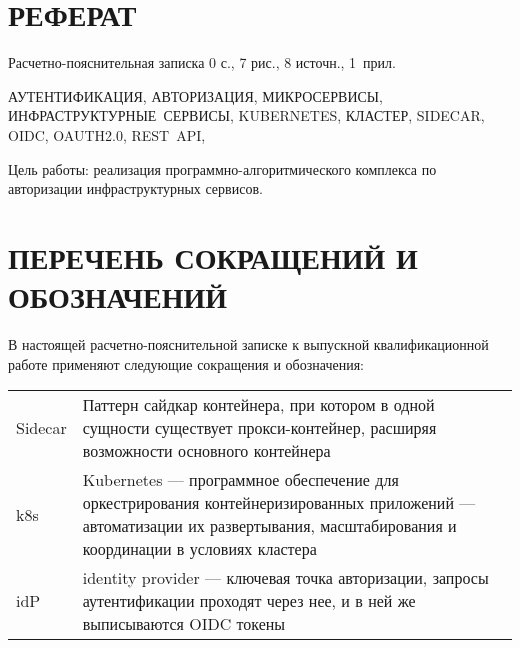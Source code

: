 {\centering \chapter*{РЕФЕРАТ}}

Расчетно-пояснительная записка 0 с., 7 рис., 8 источн., \mbox{1 прил.}

\noindent \mbox{АУТЕНТИФИКАЦИЯ}, \mbox{АВТОРИЗАЦИЯ}, \mbox{МИКРОСЕРВИСЫ}, \mbox{ИНФРАСТРУКТУРНЫЕ СЕРВИСЫ}, \mbox{KUBERNETES}, \mbox{КЛАСТЕР},  \mbox{SIDECAR}, \mbox{OIDC}, \mbox{OAUTH2.0}, \mbox{REST API},

Цель работы: реализация программно-алгоритмического комплекса по авторизации инфраструктурных сервисов.

{\centering \maketableofcontents}

{\centering \chapter*{ПЕРЕЧЕНЬ СОКРАЩЕНИЙ И ОБОЗНАЧЕНИЙ}}

В настоящей расчетно-пояснительной записке к выпускной квалификационной работе применяют следующие сокращения и обозначения:

\begin{table}[H]
\begin{tabular}{p{5cm}p{10.5cm}}
Sidecar & Паттерн сайдкар контейнера, при котором в одной сущности существует прокси-контейнер, расширяя возможности основного контейнера
\tabularnewline
k8s & Kubernetes --- программное обеспечение для оркестрирования контейнеризированных приложений --- автоматизации их развертывания, масштабирования и координации в условиях кластера
\tabularnewline
idP & identity provider --- ключевая точка авторизации, запросы аутентификации проходят через нее, и в ней же выписываются OIDC токены
\tabularnewline
\end{tabular}
\end{table}